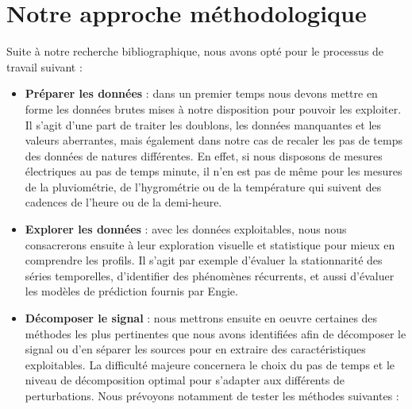 \chapter{Notre approche méthodologique}

Suite à notre recherche bibliographique, nous avons opté pour le processus de travail suivant :

\begin{itemize}
\item \textbf{Préparer les données} : dans un premier temps nous devons mettre en forme les données brutes mises à notre disposition pour pouvoir les exploiter. Il s'agit d'une part de traiter les doublons, les données manquantes et les valeurs aberrantes, mais également dans notre cas de recaler les pas de temps des données de natures différentes. En effet, si nous disposons de mesures électriques au pas de temps minute, il n'en est pas de même pour les mesures de la pluviométrie, de l'hygrométrie ou de la température qui suivent des cadences de l'heure ou de la demi-heure.
\item \textbf{Explorer les données} : avec les données exploitables, nous nous consacrerons ensuite à leur exploration visuelle et statistique pour mieux en comprendre les profils. Il s'agit par exemple d'évaluer la stationnarité des séries temporelles, d'identifier des phénomènes récurrents, et aussi d'évaluer les modèles de prédiction fournis par Engie.
\item \textbf{Décomposer le signal} : nous mettrons ensuite en oeuvre certaines des méthodes les plus pertinentes que nous avons identifiées afin de décomposer le signal ou d'en séparer les sources pour en extraire des caractéristiques exploitables. La difficulté majeure concernera le choix du pas de temps et le niveau de décomposition optimal pour s'adapter aux différents de perturbations. Nous prévoyons notamment de tester les méthodes suivantes :


\end{itemize}
